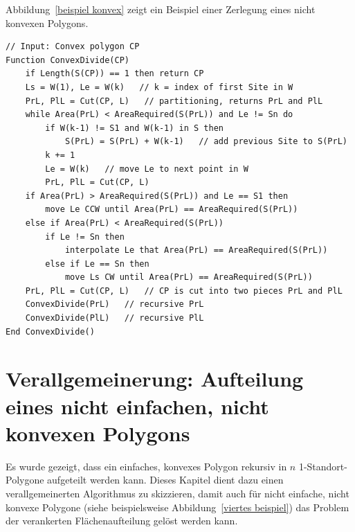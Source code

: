 \documentclass[ngerman]{seminarbeitrag}
\begin{document}
Abbildung~\ref{beispiel konvex} zeigt ein Beispiel einer Zerlegung eines nicht konvexen Polygons.


\begin{lstlisting}[float,caption={Der vollständige Algorithmus \mbox{\textit{ConvexDivide}}}, frame=single, label=code konvex]
// Input: Convex polygon CP
Function ConvexDivide(CP)
    if Length(S(CP)) == 1 then return CP 
    Ls = W(1), Le = W(k)   // k = index of first Site in W
    PrL, PlL = Cut(CP, L)   // partitioning, returns PrL and PlL
    while Area(PrL) < AreaRequired(S(PrL)) and Le != Sn do
        if W(k-1) != S1 and W(k-1) in S then 
            S(PrL) = S(PrL) + W(k-1)   // add previous Site to S(PrL)
        k += 1
        Le = W(k)   // move Le to next point in W
        PrL, PlL = Cut(CP, L)
    if Area(PrL) > AreaRequired(S(PrL)) and Le == S1 then
        move Le CCW until Area(PrL) == AreaRequired(S(PrL))
    else if Area(PrL) < AreaRequired(S(PrL)) 
        if Le != Sn then
            interpolate Le that Area(PrL) == AreaRequired(S(PrL))
        else if Le == Sn then 
            move Ls CW until Area(PrL) == AreaRequired(S(PrL))
    PrL, PlL = Cut(CP, L)   // CP is cut into two pieces PrL and PlL
    ConvexDivide(PrL)   // recursive PrL
    ConvexDivide(PlL)   // recursive PlL
End ConvexDivide()
\end{lstlisting}



\section{Verallgemeinerung: Aufteilung eines nicht einfachen, nicht konvexen Polygons}\label{nicht konvex}
Es wurde gezeigt, dass ein einfaches, konvexes Polygon rekursiv in $n$ 1-Standort-Polygone aufgeteilt werden kann. Dieses Kapitel dient dazu einen verallgemeinerten Algorithmus zu skizzieren, damit auch für nicht einfache, nicht konvexe Polygone (siehe beispielsweise Abbildung~\ref{viertes beispiel}) das Problem der verankerten Flächenaufteilung gelöst werden kann.
\end{document}
